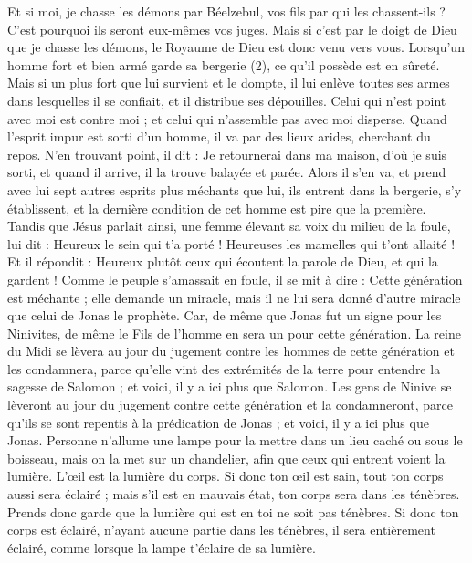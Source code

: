 \begin{multicols}{2}
Et si moi, je chasse les démons par Béelzebul, vos fils par qui les chassent-ils ? C’est pourquoi ils seront eux-mêmes vos juges.
Mais si c’est par le doigt de Dieu que je chasse les démons, le Royaume de Dieu est donc venu vers vous.
Lorsqu’un homme fort et bien armé garde sa bergerie (2), ce qu’il possède est en sûreté.
Mais si un plus fort que lui survient et le dompte, il lui enlève toutes ses armes dans lesquelles il se confiait, et il distribue ses dépouilles.
Celui qui n'est point avec moi est contre moi ; et celui qui n'assemble pas avec moi disperse.
\TextTitle{[grandeur]}
Quand l'esprit impur est sorti d'un homme, il va par des lieux arides, cherchant du repos. N’en trouvant point, il dit : Je retournerai dans ma maison, d'où je suis sorti,
et quand il arrive, il la trouve balayée et parée.
Alors il s'en va, et prend avec lui sept autres esprits plus méchants que lui, ils entrent dans la bergerie, s’y établissent, et la dernière condition de cet homme est pire que la première.
Tandis que Jésus parlait ainsi, une femme élevant sa voix du milieu de la foule, lui dit : Heureux le sein qui t'a porté ! Heureuses les mamelles qui t’ont allaité !
Et il répondit : Heureux plutôt ceux qui écoutent la parole de Dieu, et qui la gardent !
Comme le peuple s’amassait en foule, il se mit à dire : Cette génération est méchante ; elle demande un miracle, mais il ne lui sera donné d’autre miracle que celui de Jonas le prophète.
Car, de même que Jonas fut un signe pour les Ninivites, de même le Fils de l'homme en sera un pour cette génération.
La reine du Midi se lèvera au jour du jugement contre les hommes de cette génération et les condamnera, parce qu'elle vint des extrémités de la terre pour entendre la sagesse de Salomon ; et voici, il y a ici plus que Salomon.
Les gens de Ninive se lèveront au jour du jugement contre cette génération et la condamneront, parce qu'ils se sont repentis à la prédication de Jonas ; et voici, il y a ici plus que Jonas.
\TextTitle{[grandeur]}
Personne n’allume une lampe pour la mettre dans un lieu caché ou sous le boisseau, mais on la met sur un chandelier, afin que ceux qui entrent voient la lumière.
L’œil est la lumière du corps. Si donc ton œil est sain, tout ton corps aussi sera éclairé ; mais s'il est en mauvais état, ton corps sera dans les ténèbres.
Prends donc garde que la lumière qui est en toi ne soit pas ténèbres.
Si donc ton corps est éclairé, n'ayant aucune partie dans les ténèbres, il sera entièrement éclairé, comme lorsque la lampe t'éclaire de sa lumière.

\end{multicols}
